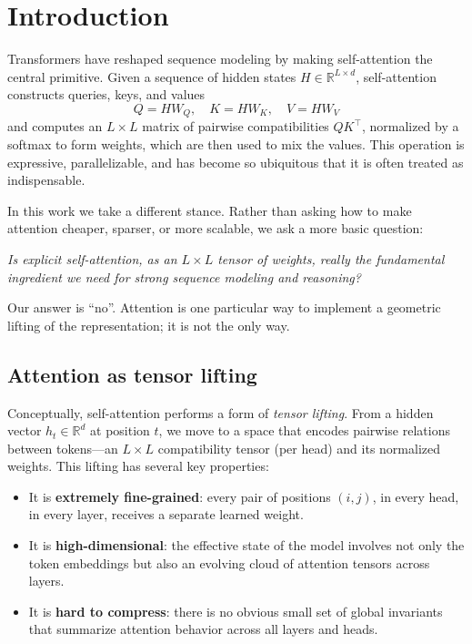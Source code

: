\documentclass[11pt]{article}
\begin{document}
\section{Introduction}

Transformers\cite{vaswani2017attention,devlin2019bert,brown2020language,dosovitskiy2020image} have reshaped sequence modeling by making self-attention the central primitive. Given a sequence of hidden states $H \in \mathbb{R}^{L \times d}$, self-attention constructs queries, keys, and values
\[
Q = H W_Q,\quad K = H W_K,\quad V = H W_V
\]
and computes an $L \times L$ matrix of pairwise compatibilities $QK^\top$, normalized by a softmax to form weights, which are then used to mix the values. This operation is expressive, parallelizable, and has become so ubiquitous that it is often treated as indispensable.

In this work we take a different stance. Rather than asking how to make attention cheaper, sparser, or more scalable, we ask a more basic question:

\medskip
\noindent\emph{Is explicit self-attention, as an $L\times L$ tensor of weights, really the fundamental ingredient we need for strong sequence modeling and reasoning?}
\medskip

Our answer is ``no''. Attention is one particular way to implement a geometric lifting of the representation; it is not the only way.

\subsection{Attention as tensor lifting}

Conceptually, self-attention performs a form of \emph{tensor lifting}. From a hidden vector $h_t \in \mathbb{R}^d$ at position $t$, we move to a space that encodes pairwise relations between tokens---an $L \times L$ compatibility tensor (per head) and its normalized weights. This lifting has several key properties:

\begin{itemize}
    \item It is \textbf{extremely fine-grained}: every pair of positions $(i,j)$, in every head, in every layer, receives a separate learned weight.
    \item It is \textbf{high-dimensional}: the effective state of the model involves not only the token embeddings but also an evolving cloud of attention tensors across layers.
    \item It is \textbf{hard to compress}: there is no obvious small set of global invariants that summarize attention behavior across all layers and heads.
\end{itemize}
\end{document}
